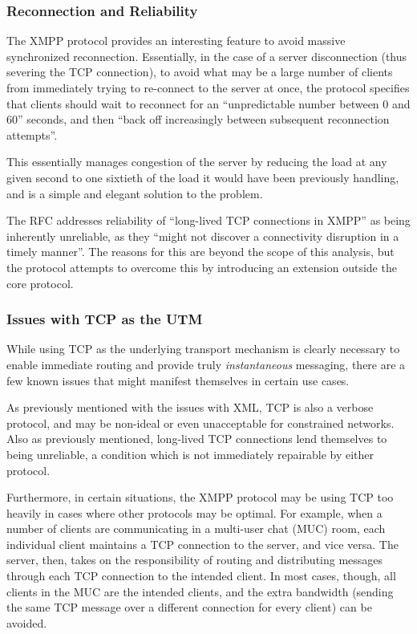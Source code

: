 \documentclass{article}
\begin{document}
\subsubsection{Reconnection and Reliability}
The XMPP protocol provides an interesting feature to avoid massive synchronized
reconnection. Essentially, in the case of a server disconnection (thus severing
the TCP connection), to avoid what may be a large number of clients from
immediately trying to re-connect to the server at once, the protocol specifies
that clients should wait to reconnect for an ``unpredictable number between 0
and 60'' seconds, and then ``back off increasingly between subsequent
reconnection attempts''.

This essentially manages congestion of the server by reducing the load at any
given second to one sixtieth of the load it would have been previously handling,
and is a simple and elegant solution to the problem.

The RFC addresses reliability of ``long-lived TCP connections in XMPP'' as being
inherently unreliable, as they ``might not discover a connectivity disruption in
a timely manner''. The reasons for this are beyond the scope of this analysis,
but the protocol attempts to overcome this by introducing an extension outside
the core protocol.

\subsubsection{Issues with TCP as the UTM}
While using TCP as the underlying transport mechanism is clearly necessary to
enable immediate routing and provide truly \emph{instantaneous} messaging, there
are a few known issues that might manifest themselves in certain use cases.

As previously mentioned with the issues with XML, TCP is also a verbose
protocol, and may be non-ideal or even unacceptable for constrained networks.
Also as previously mentioned, long-lived TCP connections lend themselves to
being unreliable, a condition which is not immediately repairable by either
protocol.

Furthermore, in certain situations, the XMPP protocol may be using TCP too
heavily in cases where other protocols may be optimal. For example, when a
number of clients are communicating in a multi-user chat (MUC) room, each
individual client maintains a TCP connection to the server, and vice versa. The
server, then, takes on the responsibility of routing and distributing messages
through each TCP connection to the intended client. In most cases, though, all
clients in the MUC are the intended clients, and the extra bandwidth (sending
the same TCP message over a different connection for every client) can be
avoided.
\end{document}
